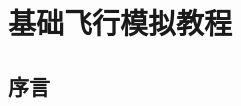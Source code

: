 \newcommand{\weblong}[2]{\href{#1}{#2}} %
\newcommand {\key}[1]{\textbf{\ttfamily{#1}}} %
\newcommand {\button}[1]{\textbf{\sffamily{#1}}} %
\newcommand {\command}[1]{{\ttfamily{#1}}} %
\newcommand {\excl}[1]{
    \begin{tabular}{r p{0.75\textwidth}}
    \hspace*{5mm}\LARGE{\textcolor{green}{$!$
}} & #1\\
\end{tabular}
}
\newcommand {\photo}[3]
{\begin{center}
  \texttt{[image: img/\#3]}
\end{center}}

\ifchinese
\chapter{{\\}基础飞行模拟教程}
\fi

{}
\label{basic}

\ifchinese
\section{序言}
\fi

{}
\label{sec:Foreword}

